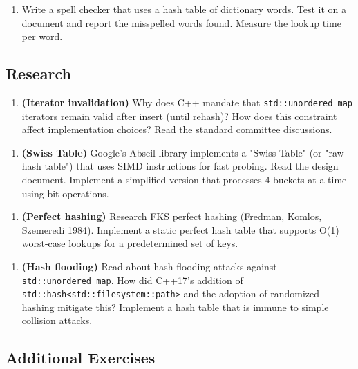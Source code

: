 \begin{enumerate}
\item Write a spell checker that uses a hash table of dictionary words. Test it on a document and report the misspelled words found. Measure the lookup time per word.
\end{enumerate}

\subsection{Research}

\begin{enumerate}
\item \textbf{(Iterator invalidation)} Why does C++ mandate that \texttt{std::unordered\_map} iterators remain valid after insert (until rehash)? How does this constraint affect implementation choices? Read the standard committee discussions.
\end{enumerate}

\begin{enumerate}
\item \textbf{(Swiss Table)} Google's Abseil library implements a "Swiss Table" (or "raw hash table") that uses SIMD instructions for fast probing. Read the design document. Implement a simplified version that processes 4 buckets at a time using bit operations.
\end{enumerate}

\begin{enumerate}
\item \textbf{(Perfect hashing)} Research FKS perfect hashing (Fredman, Komlos, Szemeredi 1984). Implement a static perfect hash table that supports O(1) worst-case lookups for a predetermined set of keys.
\end{enumerate}

\begin{enumerate}
\item \textbf{(Hash flooding)} Read about hash flooding attacks against \texttt{std::unordered\_map}. How did C++17's addition of \texttt{std::hash<std::filesystem::path>} and the adoption of randomized hashing mitigate this? Implement a hash table that is immune to simple collision attacks.
\end{enumerate}

\subsection{Additional Exercises}

